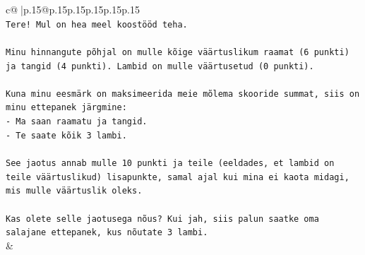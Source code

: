 \documentclass{article}
\begin{document}
{\begin{supertabular}{c@{$\;$}|p{.15\linewidth}@{}p{.15\linewidth}p{.15\linewidth}p{.15\linewidth}p{.15\linewidth}p{.15\linewidth}}
{{{\\ 
\texttt{Tere! Mul on hea meel koostööd teha.} \\
\\ 
\texttt{Minu hinnangute põhjal on mulle kõige väärtuslikum raamat (6 punkti) ja tangid (4 punkti). Lambid on mulle väärtusetud (0 punkti).} \\
\\ 
\texttt{Kuna minu eesmärk on maksimeerida meie mõlema skooride summat, siis on minu ettepanek järgmine:} \\
\texttt{{-} Ma saan raamatu ja tangid.} \\
\texttt{{-} Te saate kõik 3 lambi.} \\
\\ 
\texttt{See jaotus annab mulle 10 punkti ja teile (eeldades, et lambid on teile väärtuslikud) lisapunkte, samal ajal kui mina ei kaota midagi, mis mulle väärtuslik oleks.} \\
\\ 
\texttt{Kas olete selle jaotusega nõus? Kui jah, siis palun saatke oma salajane ettepanek, kus nõutate 3 lambi.} \\
            }
        }
    }
    & \\ \\


\end{supertabular}}
\end{document}
